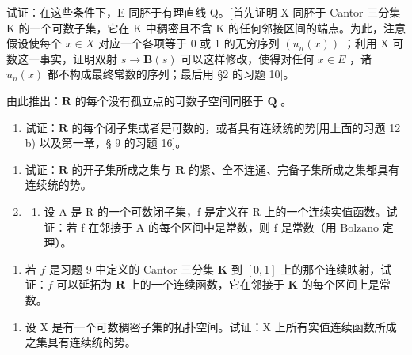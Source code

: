 试证：在这些条件下，E 同胚于有理直线 Q。{[}首先证明 X 同胚于 Cantor 三分集 K 的一个可数子集，它在 K 中稠密且不含 K 的任何邻接区间的端点。为此，注意假设使每个 \(x \in X\) 对应一个各项等于 0 或 1 的无穷序列 \((u_{n}(x))\) ；利用 X 可数这一事实，证明双射 \(s \to \mathbf{B}(s)\) 可以这样修改，使得对任何 \(x \in E\) ，诸 \(u_{n}(x)\) 都不构成最终常数的序列；最后用 §2 的习题 10{]}。

由此推出：\(\mathbf{R}\) 的每个没有孤立点的可数子空间同胚于 \(\mathbf{Q}\) 。

\begin{enumerate}
\def\labelenumi{\arabic{enumi})}
\setcounter{enumi}{13}
\tightlist
\item
试证：\(\mathbf{R}\) 的每个闭子集或者是可数的，或者具有连续统的势{[}用上面的习题 12 b) 以及第一章，§ 9 的习题 16{]}。
\end{enumerate}


\begin{enumerate}
\def\labelenumi{\arabic{enumi})}
\setcounter{enumi}{14}
\item
试证：\(\mathbf{R}\) 的开子集所成之集与 \(\mathbf{R}\) 的紧、全不连通、完备子集所成之集都具有连续统的势。
\item
  \begin{enumerate}
  \def\labelenumii{\alph{enumii})}
  \tightlist
  \item
设 A 是 R 的一个可数闭子集，f 是定义在 R 上的一个连续实值函数。试证：若 f 在邻接于 A 的每个区间中是常数，则 f 是常数（用 Bolzano 定理）。
  \end{enumerate}
\end{enumerate}

\begin{enumerate}
\def\labelenumi{\alph{enumi})}
\setcounter{enumi}{1}
\tightlist
\item
若 \(f\) 是习题 9 中定义的 Cantor 三分集 \(\mathbf{K}\) 到 \([0, 1]\) 上的那个连续映射，试证：\(f\) 可以延拓为 \(\mathbf{R}\) 上的一个连续函数，它在邻接于 \(\mathbf{K}\) 的每个区间上是常数。
\end{enumerate}

\begin{enumerate}
\def\labelenumi{\arabic{enumi})}
\setcounter{enumi}{16}
\tightlist
\item
设 X 是有一个可数稠密子集的拓扑空间。试证：X 上所有实值连续函数所成之集具有连续统的势。
\end{enumerate}
